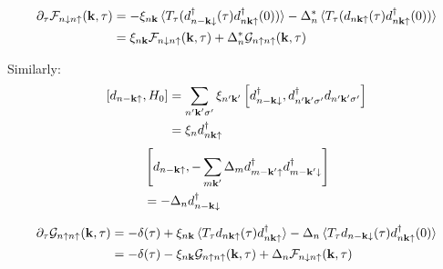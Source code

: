 \begin{align}
    \pdif{\tau} \mathcal{F}_{n\downarrow n\uparrow} (\vb{k}, \tau) &=
    -\xi_{n \vb{k}} \braket{T_{\tau} (d_{n -\vb{k} \downarrow}^{\dagger} (\tau) d_{n \vb{k} \uparrow}^{\dagger} (0))} - \Delta_n^* \braket{T_{\tau} (d_{n \vb{k} \uparrow} (\tau) d_{n \vb{k} \uparrow}^{\dagger} (0))} \\
    &= \xi_{n \vb{k}} \mathcal{F}_{n \downarrow n \uparrow} (\vb{k}, \tau) + \Delta_{n}^* \mathcal{G}_{n\uparrow n\uparrow} (\vb{k}, \tau)
\end{align}

Similarly:
\begin{align}
    \left[ d_{n -\bm{\mathrm{k}} \uparrow}, H_0 \right]
    &= \sum_{n^{\prime} \bm{\mathrm{k}}^{\prime} \sigma^{\prime}} \xi_{n^{\prime} \bm{\mathrm{k}}^{\prime}} \left[ d_{n -\bm{\mathrm{k}} \downarrow}^{\dagger}, d_{n^{\prime} \bm{\mathrm{k}}^{\prime} \sigma^{\prime}}^{\dagger} d_{n^{\prime} \bm{\mathrm{k}}^{\prime} \sigma^{\prime}} \right] \\
    &= \xi_{n} d_{n \bm{\mathrm{k}} \uparrow}^{\dagger}
\end{align}
\begin{align}
    &\left[d_{n -\bm{\mathrm{k}} \uparrow}, -\sum_{m \bm{\mathrm{k}}^{\prime}} \Delta_{m} d_{m -\bm{\mathrm{k}}^{\prime} \uparrow}^{\dagger} d_{m -\bm{\mathrm{k}}^{\prime} \downarrow}^{\dagger} \right] \\
    &= - \Delta_n d_{n -\bm{\mathrm{k}} \downarrow}^{\dagger}
\end{align}

\begin{align}
    \pdif{\tau} \mathcal{G}_{n \uparrow n \uparrow} (\vb{k}, \tau) &=
    -\delta(\tau) + \xi_{n \vb{k}} \braket{T_{\tau} d_{n \vb{k} \uparrow} (\tau) d_{n \vb{k} \uparrow}^{\dagger}} - \Delta_n \braket{T_{\tau} d_{n -\vb{k} \downarrow} (\tau) d_{n \vb{k} \uparrow}^{\dagger} (0)} \\
    &= -\delta(\tau) - \xi_{n \vb{k}} \mathcal{G}_{n \uparrow n \uparrow} (\vb{k}, \tau) + \Delta_{n} \mathcal{F}_{n\downarrow n\uparrow} (\vb{k}, \tau) \\
\end{align}

